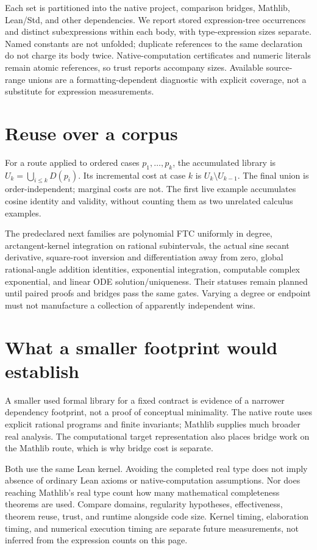 Each set is partitioned into the native project, comparison bridges, Mathlib,
Lean/Std, and other dependencies. We report stored expression-tree occurrences
and distinct subexpressions within each body, with type-expression sizes
separate. Named constants are not unfolded; duplicate references to the same
declaration do not charge its body twice. Native-computation certificates and
numeric literals remain atomic references, so trust reports accompany sizes.
Available source-range unions are a formatting-dependent diagnostic with
explicit coverage, not a substitute for expression measurements.

\section{Reuse over a corpus}
For a route applied to ordered cases $p_1,\ldots,p_k$, the accumulated library
is $U_k=\bigcup_{i\le k}D(p_i)$. Its incremental cost at case $k$ is
$U_k\setminus U_{k-1}$. The final union is order-independent; marginal costs
are not. The first live example accumulates cosine identity and validity,
without counting them as two unrelated calculus examples.

The predeclared next families are polynomial FTC uniformly in degree,
arctangent-kernel integration on rational subintervals, the actual sine
secant derivative, square-root inversion and differentiation away from zero,
global rational-angle addition identities, exponential integration, computable
complex exponential, and linear ODE solution/uniqueness. Their statuses remain
planned until paired proofs and bridges pass the same gates. Varying a degree
or endpoint must not manufacture a collection of apparently independent wins.

\section{What a smaller footprint would establish}
A smaller used formal library for a fixed contract is evidence of a narrower
dependency footprint, not a proof of conceptual minimality. The native route
uses explicit rational programs and finite invariants; Mathlib supplies much
broader real analysis. The computational target representation also places
bridge work on the Mathlib route, which is why bridge cost is separate.

Both use the same Lean kernel. Avoiding the completed real type does not imply
absence of ordinary Lean axioms or native-computation assumptions. Nor does
reaching Mathlib's real type count how many mathematical completeness theorems
are used. Compare domains, regularity hypotheses, effectiveness, theorem reuse,
trust, and runtime alongside code size. Kernel timing, elaboration timing, and
numerical execution timing are separate future measurements, not inferred
from the expression counts on this page.
